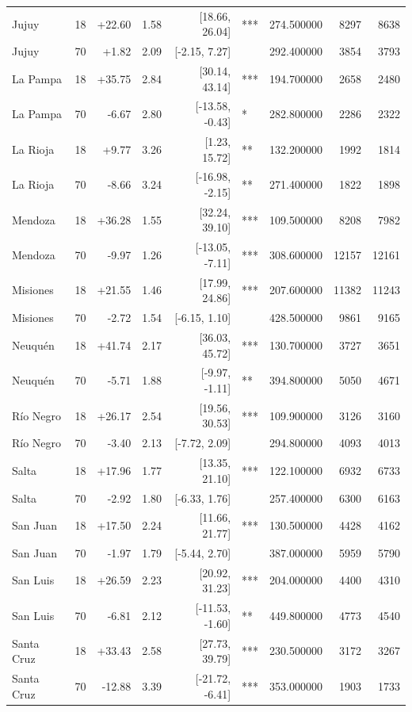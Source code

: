 \begin{table}[ht]
{\begin{tabular}{lrrrrlrrr}
Jujuy & 18 & +22.60 & 1.58 & [18.66, 26.04] & *** & 274.500000 & 8297 & 8638 \\
Jujuy & 70 & +1.82 & 2.09 & [-2.15, 7.27] &  & 292.400000 & 3854 & 3793 \\
La Pampa & 18 & +35.75 & 2.84 & [30.14, 43.14] & *** & 194.700000 & 2658 & 2480 \\
La Pampa & 70 & -6.67 & 2.80 & [-13.58, -0.43] & * & 282.800000 & 2286 & 2322 \\
La Rioja & 18 & +9.77 & 3.26 & [1.23, 15.72] & ** & 132.200000 & 1992 & 1814 \\
La Rioja & 70 & -8.66 & 3.24 & [-16.98, -2.15] & ** & 271.400000 & 1822 & 1898 \\
Mendoza & 18 & +36.28 & 1.55 & [32.24, 39.10] & *** & 109.500000 & 8208 & 7982 \\
Mendoza & 70 & -9.97 & 1.26 & [-13.05, -7.11] & *** & 308.600000 & 12157 & 12161 \\
Misiones & 18 & +21.55 & 1.46 & [17.99, 24.86] & *** & 207.600000 & 11382 & 11243 \\
Misiones & 70 & -2.72 & 1.54 & [-6.15, 1.10] &  & 428.500000 & 9861 & 9165 \\
Neuquén & 18 & +41.74 & 2.17 & [36.03, 45.72] & *** & 130.700000 & 3727 & 3651 \\
Neuquén & 70 & -5.71 & 1.88 & [-9.97, -1.11] & ** & 394.800000 & 5050 & 4671 \\
Río Negro & 18 & +26.17 & 2.54 & [19.56, 30.53] & *** & 109.900000 & 3126 & 3160 \\
Río Negro & 70 & -3.40 & 2.13 & [-7.72, 2.09] &  & 294.800000 & 4093 & 4013 \\
Salta & 18 & +17.96 & 1.77 & [13.35, 21.10] & *** & 122.100000 & 6932 & 6733 \\
Salta & 70 & -2.92 & 1.80 & [-6.33, 1.76] &  & 257.400000 & 6300 & 6163 \\
San Juan & 18 & +17.50 & 2.24 & [11.66, 21.77] & *** & 130.500000 & 4428 & 4162 \\
San Juan & 70 & -1.97 & 1.79 & [-5.44, 2.70] &  & 387.000000 & 5959 & 5790 \\
San Luis & 18 & +26.59 & 2.23 & [20.92, 31.23] & *** & 204.000000 & 4400 & 4310 \\
San Luis & 70 & -6.81 & 2.12 & [-11.53, -1.60] & ** & 449.800000 & 4773 & 4540 \\
Santa Cruz & 18 & +33.43 & 2.58 & [27.73, 39.79] & *** & 230.500000 & 3172 & 3267 \\
Santa Cruz & 70 & -12.88 & 3.39 & [-21.72, -6.41] & *** & 353.000000 & 1903 & 1733 \\

\end{tabular}}
\end{table}
